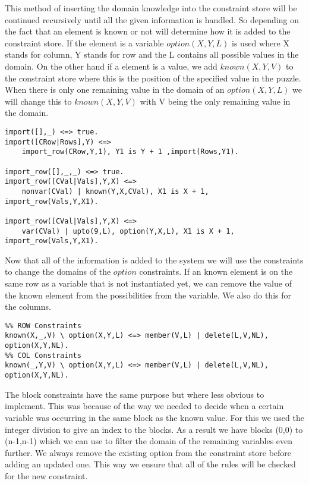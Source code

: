 This method of inserting the domain knowledge into the constraint store will be continued recursively until all the given information is handled.
So depending on the fact that an element is known or not will determine how it is added to the constraint store.
If the element is a variable \texttt{$option(X,Y,L)$} is used where X stands for column, Y stands for row and the L contains all possible values in the domain.
On the other hand if a element is a value, we add \texttt{$known(X,Y,V)$} to the constraint store where this is the position of the specified value in the puzzle.
When there is only one remaining value in the domain of an \texttt{$option(X,Y,L)$} we will change this to \texttt{$known(X,Y,V)$} with V being the only remaining value in the domain.

\begin{lstlisting}
import([],_) <=> true.
import([CRow|Rows],Y) <=>
    import_row(CRow,Y,1), Y1 is Y + 1 ,import(Rows,Y1).

import_row([],_,_) <=> true.
import_row([CVal|Vals],Y,X) <=>
    nonvar(CVal) | known(Y,X,CVal), X1 is X + 1, import_row(Vals,Y,X1).

import_row([CVal|Vals],Y,X) <=>
    var(CVal) | upto(9,L), option(Y,X,L), X1 is X + 1, import_row(Vals,Y,X1).
\end{lstlisting}

Now that all of the information is added to the system we will use the constraints to change the domains of the \texttt{$option$} constraints.
If an known element is on the same row as a variable that is not instantiated yet, we can remove the value of the known element from the possibilities from the variable.
We also do this for the columns.

\begin{lstlisting}
%% ROW Constraints
known(X,_,V) \ option(X,Y,L) <=> member(V,L) | delete(L,V,NL), option(X,Y,NL).
%% COL Constraints
known(_,Y,V) \ option(X,Y,L) <=> member(V,L) | delete(L,V,NL), option(X,Y,NL).
\end{lstlisting}

The block constraints have the same purpose but where less obvious to implement. 
This was because of the way we needed to decide when a certain variable was occurring in the same block as the known value.
For this we used the integer division to give an index to the blocks.
As a result we have blocks (0,0) to (n-1,n-1) which we can use to filter the domain of the remaining variables even further.
We always remove the existing option from the constraint store before adding an updated one.
This way we ensure that all of the rules will be checked for the new constraint.

